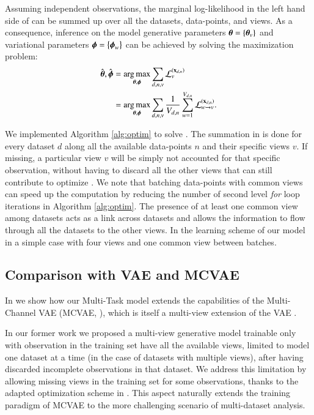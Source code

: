 Assuming independent observations, the marginal log-likelihood in the left hand side of  can be summed up over all the datasets, data-points, and views.
As a consequence, inference on the model generative parameters $\boldsymbol{\theta} = \left\{\boldsymbol{\theta}_v\right\}$ and variational parameters $\boldsymbol{\phi} = \left\{\boldsymbol{\phi}_w\right\}$ can be achieved by solving the maximization problem:
\begin{equation}\label{eq:argmax}
\begin{aligned}
\hat{\boldsymbol{\theta}}, \hat{\boldsymbol{\phi}} &= \underset{\boldsymbol{\theta}, \boldsymbol{\phi}}{\operatorname{arg\,max}} \sum_{d,n,v} \mathcal{L}_v^{(\mathbf{x}_{d,n})} \\
                           &= \underset{\boldsymbol{\theta}, \boldsymbol{\phi}}{\operatorname{arg\,max}} \sum_{d,n,v} \frac{1}{V_{d,n}} \sum_{w=1}^{V_{d,n}} \mathcal{L}_{w \rightarrow v}^{(\mathbf{x}_{d,n})}.
\end{aligned}
\end{equation}
%

%
We implemented Algorithm \ref{alg:optim} to solve .
The summation in  is done for every dataset $d$ along all the available data-points $n$ and their specific views $v$.
If missing, a particular view $v$ will be simply not accounted for that specific observation, without having to discard all the other views that can still contribute to optimize .
We note that batching data-points with common views can speed up the computation by reducing the number of second level \textit{for} loop iterations in Algorithm \ref{alg:optim}.
The presence of at least one common view among datasets acts as a link across datasets and allows the information to flow through all the datasets to the other views.
In  the learning scheme of our model in a simple case with four views and one common view between batches.



\subsection{Comparison with VAE and MCVAE}
In  we show how our Multi-Task model extends the capabilities of the Multi-Channel VAE (MCVAE, \cite{Antelmi2019}), which is itself a multi-view extension of the VAE \citep{Kingma2013,Rezende2014}.

In our former work we proposed a multi-view generative model trainable only with observation in the training set have all the available views, limited to model one dataset at a time (in the case of datasets with multiple views), after having discarded incomplete observations in that dataset.
We address this limitation by allowing missing views in the training set for some observations, thanks to the adapted optimization scheme in .
This aspect naturally extends the training paradigm of MCVAE to the more challenging scenario of multi-dataset analysis.


